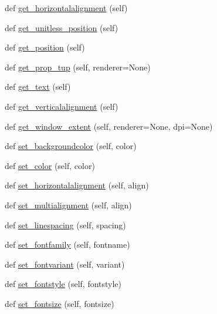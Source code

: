 \begin{DoxyCompactItemize}
\item 
def \hyperlink{classmatplotlib_1_1text_1_1Text_afcf6c05ce2d0696a760b6c9c6964f3e2}{get\+\_\+horizontalalignment} (self)
\item 
def \hyperlink{classmatplotlib_1_1text_1_1Text_ad406795ef1333c7c7ec0a2cb7d3dfda6}{get\+\_\+unitless\+\_\+position} (self)
\item 
def \hyperlink{classmatplotlib_1_1text_1_1Text_ae04a11859a96927d51c52c2955e13cc9}{get\+\_\+position} (self)
\item 
def \hyperlink{classmatplotlib_1_1text_1_1Text_ac64ce5be065cf2127913f4b04a04163a}{get\+\_\+prop\+\_\+tup} (self, renderer=None)
\item 
def \hyperlink{classmatplotlib_1_1text_1_1Text_a59e8ce9e068db6796e9722fc9eb0b61b}{get\+\_\+text} (self)
\item 
def \hyperlink{classmatplotlib_1_1text_1_1Text_a76b29d5a430010b6da900dbf41a3daca}{get\+\_\+verticalalignment} (self)
\item 
def \hyperlink{classmatplotlib_1_1text_1_1Text_ac0e2a8f598e996278b526d9173a03d63}{get\+\_\+window\+\_\+extent} (self, renderer=None, dpi=None)
\item 
def \hyperlink{classmatplotlib_1_1text_1_1Text_aee3a133f8d5a96f17e4c6e5fbd876364}{set\+\_\+backgroundcolor} (self, color)
\item 
def \hyperlink{classmatplotlib_1_1text_1_1Text_ab216c0685d9ed62a14efdaaaa3de3305}{set\+\_\+color} (self, color)
\item 
def \hyperlink{classmatplotlib_1_1text_1_1Text_abc8e073547ca21046b4ccc2efa0f4acf}{set\+\_\+horizontalalignment} (self, align)
\item 
def \hyperlink{classmatplotlib_1_1text_1_1Text_a394010ae442a3eb9603b56b1bf143293}{set\+\_\+multialignment} (self, align)
\item 
def \hyperlink{classmatplotlib_1_1text_1_1Text_a54204d41bc2039a19958109eca88a8f2}{set\+\_\+linespacing} (self, spacing)
\item 
def \hyperlink{classmatplotlib_1_1text_1_1Text_a6c6473e362b63b65c25ffe7aeea29247}{set\+\_\+fontfamily} (self, fontname)
\item 
def \hyperlink{classmatplotlib_1_1text_1_1Text_a354aada9819cf61b087269f2ca038275}{set\+\_\+fontvariant} (self, variant)
\item 
def \hyperlink{classmatplotlib_1_1text_1_1Text_a32ace76aa5fd544659ed109d7297c6e4}{set\+\_\+fontstyle} (self, fontstyle)
\item 
def \hyperlink{classmatplotlib_1_1text_1_1Text_a006dbd794ad37f9bd31254bb90a4b21e}{set\+\_\+fontsize} (self, fontsize)

\end{DoxyCompactItemize}
